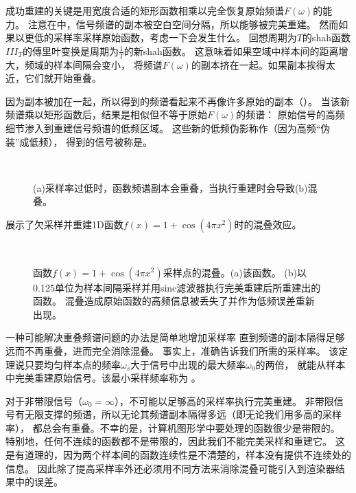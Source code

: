 成功重建的关键是用宽度合适的矩形函数相乘以完全恢复原始频谱$F(\omega)$的能力。
注意在中，信号频谱的副本被空白空间分隔，所以能够被完美重建。
然而如果以更低的采样率采样原始函数，考虑一下会发生什么。
回想周期为$T$的shah函数$III_T$的傅里叶变换是周期为$\displaystyle\frac{1}{T}$的新shah函数。
这意味着如果空域中样本间的距离增大，频域的样本间隔会变小，
将频谱$F(\omega)$的副本挤在一起。如果副本挨得太近，它们就开始重叠。

因为副本被加在一起，所以得到的频谱看起来不再像许多原始的副本（）。
当该新频谱乘以矩形函数后，结果是相似但不等于原始$F(\omega)$的频谱：
原始信号的高频细节渗入到重建信号频谱的低频区域。
这些新的低频伪影称作（因为高频“伪装”成低频），
得到的信号被称是。
\begin{figure}
    \centering
    \,
    \caption{(a)采样率过低时，函数频谱副本会重叠，当执行重建时会导致(b)混叠。}
    \label{fig:7.8}
\end{figure}

展示了欠采样并重建1D函数$f(x)=1+\cos(4\pi x^2)$时的混叠效应。
\begin{figure}[htbp]
    \centering
    \,
    \caption{函数$f(x)=1+\cos(4\pi x^2)$采样点的混叠。(a)该函数。
        (b)以0.125单位为样本间隔采样并用sinc滤波器执行完美重建后所重建出的函数。
        混叠造成原始函数的高频信息被丢失了并作为低频误差重新出现。}
    \label{fig:7.9}
\end{figure}

一种可能解决重叠频谱问题的办法是简单地增加采样率
直到频谱的副本隔得足够远而不再重叠，进而完全消除混叠。
事实上，准确告诉我们所需的采样率。
该定理说只要均匀样本点的频率$\omega_s$大于信号中出现的最大频率$\omega_0$的两倍，
就能从样本中完美重建原始信号。该最小采样频率称为
。

对于非带限信号（$\omega_0=\infty$），不可能以足够高的采样率执行完美重建。
非带限信号有无限支撑的频谱，所以无论其频谱副本隔得多远（即无论我们用多高的采样率），
都总会有重叠。不幸的是，计算机图形学中要处理的函数很少是带限的。
特别地，任何不连续的函数都不是带限的，因此我们不能完美采样和重建它。
这是有道理的，因为两个样本间的函数连续性是不清楚的，样本没有提供不连续处的信息。
因此除了提高采样率外还必须用不同方法来消除混叠可能引入到渲染器结果中的误差。


